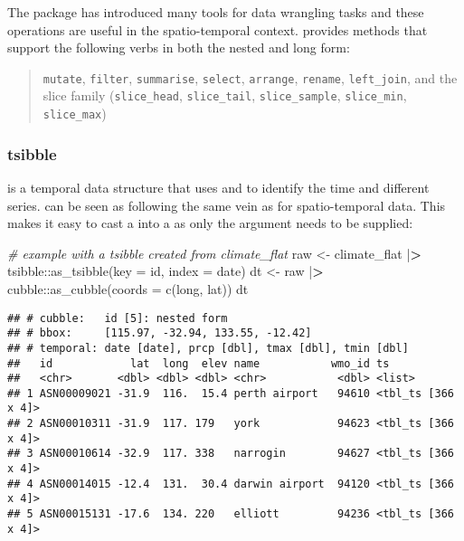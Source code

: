 \documentclass{article}
\newenvironment{Shaded}{\begin{snugshade}}{\end{snugshade}}
\newcommand{\AttributeTok}[1]{\textcolor[rgb]{0.77,0.63,0.00}{#1}}
\newcommand{\CommentTok}[1]{\textcolor[rgb]{0.56,0.35,0.01}{\textit{#1}}}
\newcommand{\ErrorTok}[1]{\textcolor[rgb]{0.64,0.00,0.00}{\textbf{#1}}}
\newcommand{\FunctionTok}[1]{\textcolor[rgb]{0.00,0.00,0.00}{#1}}
\newcommand{\NormalTok}[1]{#1}
\newcommand{\OtherTok}[1]{\textcolor[rgb]{0.56,0.35,0.01}{#1}}
\newcommand{\SpecialCharTok}[1]{\textcolor[rgb]{0.00,0.00,0.00}{#1}}
\begin{document}
The  package has introduced many tools for data wrangling tasks and these operations are useful in the spatio-temporal context.  provides methods that support the following  verbs in both the nested and long form:

\begin{quote}
\texttt{mutate}, \texttt{filter}, \texttt{summarise}, \texttt{select}, \texttt{arrange}, \texttt{rename}, \texttt{left\_join}, and the slice family (\texttt{slice\_head}, \texttt{slice\_tail}, \texttt{slice\_sample}, \texttt{slice\_min}, \texttt{slice\_max})
\end{quote}

\hypertarget{tsibble}{%
\subsubsection{tsibble}\label{tsibble}}

 is a temporal data structure that uses  and  to identify the time and different series.  can be seen as following the same vein as  for spatio-temporal data. This makes it easy to cast a  into a  as only the  argument needs to be supplied:

\begin{Shaded}
\begin{Highlighting}[]
\CommentTok{\# example with a tsibble created from climate\_flat}
\NormalTok{raw }\OtherTok{\textless{}{-}}\NormalTok{ climate\_flat }\SpecialCharTok{|}\ErrorTok{\textgreater{}}\NormalTok{ tsibble}\SpecialCharTok{::}\FunctionTok{as\_tsibble}\NormalTok{(}\AttributeTok{key =}\NormalTok{ id, }\AttributeTok{index =}\NormalTok{ date)}
\NormalTok{dt }\OtherTok{\textless{}{-}}\NormalTok{  raw }\SpecialCharTok{|}\ErrorTok{\textgreater{}}\NormalTok{ cubble}\SpecialCharTok{::}\FunctionTok{as\_cubble}\NormalTok{(}\AttributeTok{coords =} \FunctionTok{c}\NormalTok{(long, lat))}
\NormalTok{dt}
\end{Highlighting}
\end{Shaded}

\begin{verbatim}
## # cubble:   id [5]: nested form
## # bbox:     [115.97, -32.94, 133.55, -12.42]
## # temporal: date [date], prcp [dbl], tmax [dbl], tmin [dbl]
##   id            lat  long  elev name           wmo_id ts                
##   <chr>       <dbl> <dbl> <dbl> <chr>           <dbl> <list>            
## 1 ASN00009021 -31.9  116.  15.4 perth airport   94610 <tbl_ts [366 x 4]>
## 2 ASN00010311 -31.9  117. 179   york            94623 <tbl_ts [366 x 4]>
## 3 ASN00010614 -32.9  117. 338   narrogin        94627 <tbl_ts [366 x 4]>
## 4 ASN00014015 -12.4  131.  30.4 darwin airport  94120 <tbl_ts [366 x 4]>
## 5 ASN00015131 -17.6  134. 220   elliott         94236 <tbl_ts [366 x 4]>
\end{verbatim}
\end{document}
